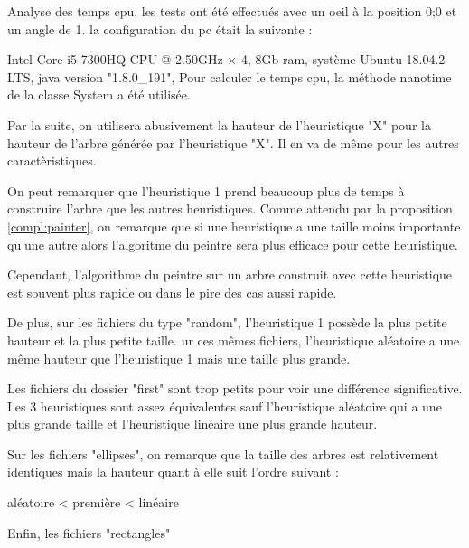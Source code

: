Analyse des temps cpu.
les tests ont été effectués avec un oeil à la position 0;0 et un angle de 1.
la configuration du pc était la suivante :

\begin{center}
  Intel Core i5-7300HQ CPU @ 2.50GHz × 4,  8Gb ram, système Ubuntu 18.04.2 LTS, java version "1.8.0_191",
  Pour calculer le temps cpu, la méthode nanotime de la classe System a été utilisée. 
\end{center}

Par la suite, on utilisera abusivement la hauteur de l'heuristique "X" pour la hauteur de l'arbre générée par l'heuristique "X". Il en va de même pour les autres caractèristiques.


On peut remarquer que l'heuristique 1 prend beaucoup plus de temps à construire l'arbre que les autres heuristiques.
Comme attendu par la proposition \ref{compl:painter}, on remarque que si une heuristique a une taille moins importante qu'une autre alors l'algoritme du peintre sera plus efficace pour cette heuristique.

Cependant, l'algorithme du peintre sur un arbre construit avec cette heuristique est souvent plus rapide ou dans le pire des cas aussi rapide.

De plus, sur les fichiers du type "random", l'heuristique 1 possède la plus petite hauteur et la plus petite taille.
ur ces mêmes fichiers, l'heuristique aléatoire  a une même hauteur que l'heuristique 1 mais une taille plus grande. 

Les fichiers du dossier "first" sont trop petits pour voir une différence significative. Les 3 heuristiques sont assez équivalentes sauf l'heuristique aléatoire qui a une plus grande taille et l'heuristique linéaire une plus grande hauteur.

Sur les fichiers "ellipses", on remarque que la taille des arbres est relativement identiques mais la hauteur quant à elle suit l'ordre suivant :

\begin{center}
  aléatoire < première < linéaire
\end{center}

Enfin, les fichiers "rectangles"  



